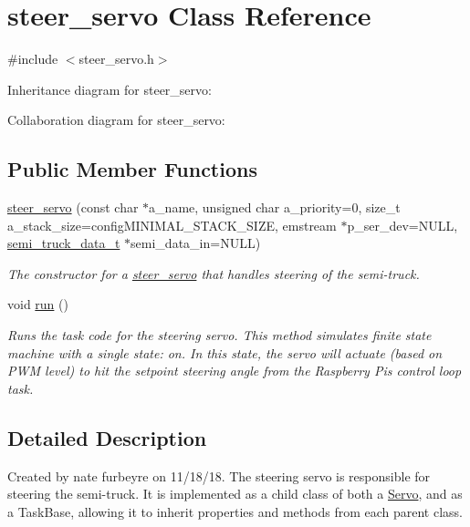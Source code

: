 \hypertarget{classsteer__servo}{}\section{steer\+\_\+servo Class Reference}
\label{classsteer__servo}


{\ttfamily \#include $<$steer\+\_\+servo.\+h$>$}



Inheritance diagram for steer\+\_\+servo\+:


Collaboration diagram for steer\+\_\+servo\+:
\subsection*{Public Member Functions}
\begin{DoxyCompactItemize}
\item 
\hyperlink{classsteer__servo_a274e90a556e155fb9c6f82a4f1a1fed7}{steer\+\_\+servo} (const char $\ast$a\+\_\+name, unsigned char a\+\_\+priority=0, size\+\_\+t a\+\_\+stack\+\_\+size=config\+M\+I\+N\+I\+M\+A\+L\+\_\+\+S\+T\+A\+C\+K\+\_\+\+S\+I\+ZE, emstream $\ast$p\+\_\+ser\+\_\+dev=N\+U\+LL, \hyperlink{structsemi__truck__data__t}{semi\+\_\+truck\+\_\+data\+\_\+t} $\ast$semi\+\_\+data\+\_\+in=N\+U\+LL)
\begin{DoxyCompactList}\small\item\em The constructor for a \hyperlink{classsteer__servo}{steer\+\_\+servo} that handles steering of the semi-\/truck. \end{DoxyCompactList}\item 
void \hyperlink{classsteer__servo_a8ae49f90971ecc0baf116096c0609bdd}{run} ()\hypertarget{classsteer__servo_a8ae49f90971ecc0baf116096c0609bdd}{}\label{classsteer__servo_a8ae49f90971ecc0baf116096c0609bdd}

\begin{DoxyCompactList}\small\item\em Runs the task code for the steering servo. This method simulates finite state machine with a single state\+: on. In this state, the servo will actuate (based on P\+WM level) to hit the setpoint steering angle from the Raspberry Pi\textquotesingle{}s control loop task. \end{DoxyCompactList}\end{DoxyCompactItemize}


\subsection{Detailed Description}
Created by nate furbeyre on 11/18/18. The steering servo is responsible for steering the semi-\/truck. It is implemented as a child class of both a \hyperlink{classServo}{Servo}, and as a Task\+Base, allowing it to inherit properties and methods from each parent class. 

